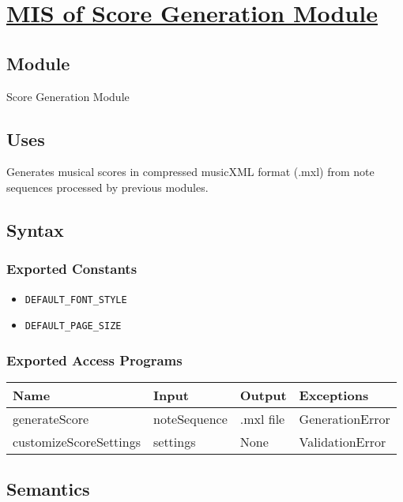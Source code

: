 \documentclass[12pt, titlepage]{article}
\begin{document}
\section{\hyperref[mSG]{MIS of Score Generation Module}} \label{M3}  

\subsection{Module}  
Score Generation Module  

\subsection{Uses}  
Generates musical scores in compressed musicXML format (.mxl) from note 
sequences processed by previous modules.  

\subsection{Syntax}  

\subsubsection{Exported Constants}  
\begin{itemize}
    \item \texttt{DEFAULT\_FONT\_STYLE}  
    \item \texttt{DEFAULT\_PAGE\_SIZE}  
\end{itemize}  

\subsubsection{Exported Access Programs}  
\begin{center}  
\begin{tabular}{|p{5cm}|p{4cm}|p{2cm}|p{3.5cm}|}  
\hline  
\textbf{Name} & \textbf{Input} & \textbf{Output} & \textbf{Exceptions} \\  
\hline  
generateScore & noteSequence & .mxl file & GenerationError \\  
customizeScoreSettings & settings & None & ValidationError \\  
\hline  
\end{tabular}  
\end{center}  

\subsection{Semantics}  
\end{document}
